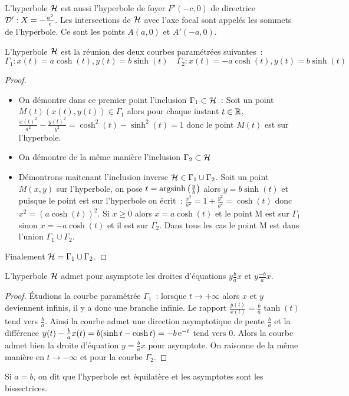 L'hyperbole $\mathcal{H}$ est aussi l'hyperbole de foyer $F'(-c,0)$ de directrice $\mathcal{D} ':X=-\frac{a^2}{c}$. Les intersections de $\mathcal{H}$ avec l'axe focal sont appelés les sommets de l'hyperbole. Ce sont les points $A(a,0)$ et $A'(-a,0)$.
\begin{prop}
  L'hyperbole $\mathcal{H}$ est la réunion des deux courbes paramétrées suivantes~:
  \begin{equation}
    \Gamma_1 : x(t)=a\cosh(t), y(t)=b\sinh(t) \quad \Gamma_2 : x(t)=-a\cosh(t), y(t)=b\sinh(t)
  \end{equation}
\end{prop}
\begin{proof}
  \begin{itemize}
  \item On démontre dans ce premier point l'inclusion $\Gamma_1 \subset \mathcal{H}$~: Soit un point $M(t)(x(t),y(t)) \in \Gamma_1$ alors pour chaque instant $t \in \mathbb{R}$, $\frac{x(t)^2}{a^2}-\frac{y(t)^2}{b^2}=\cosh^2(t)-\sinh^2(t)=1$ donc le point $M(t)$ est sur l'hyperbole.
  \item On démontre de la même manière l'inclusion  $\Gamma_2 \subset \mathcal{H}$
  \item Démontrons maitenant l'inclusion inverse $\mathcal{H} \in \Gamma_1\cup\Gamma_2$. Soit un point $M(x,y)$ sur l'hyperbole, on pose $t=\operatorname{argsinh}\left(\frac{y}{b}\right)$ alors $y=b\sinh(t)$ et puisque le point est sur l'hyperbole on écrit~: $\frac{x^2}{a^2}=1+\frac{y^2}{b^2}=\cosh(t)$ donc $x^2=(a\cosh(t))^2$. Si $x\geq 0$ alors $x=a\cosh(t)$ et le point M est sur $\Gamma_1$ sinon $x=-a\cosh(t)$ et il est sur $\Gamma_2$. Dans tous les cas le point M est dans l'union $\Gamma_1 \cup \Gamma_2$.
  \end{itemize}
Finalement $\mathcal{H}=\Gamma_1 \cup \Gamma_2$.
\end{proof}
\begin{prop}
  L'hyperbole $\mathcal{H}$ admet pour asymptote les droites d'équations $y\frac{b}{a}x$ et $y\frac{-b}{a}x$.
\end{prop}
\begin{proof}
  Étudions la courbe paramétrée $\Gamma_1$~: lorsque $t \to +\infty$ alors $x$ et $y$ deviennent infinis, il y a donc une branche infinie. Le rapport $\frac{y(t)}{x(t)}=\frac{b}{a} \tanh(t)$ tend vers $\frac{b}{a}$. Ainsi la courbe admet une direction asymptotique de pente $\frac{b}{a}$ et la différence $y(t) -\frac{b}{a}x(t)=b(\sinh t -\cosh t)=-b\operatorname{e}^{-t}$ tend vers 0. Alors la courbe admet bien la droite d'équation $y=\frac{b}{a}x$ pour asymptote. On raisonne de la même manière en $t\to -\infty$ et pour la courbe $\Gamma_2$.
\end{proof}
Si $a=b$, on dit que l'hyperbole est équilatère et les asymptotes sont les bissectrices.


